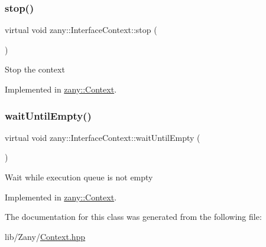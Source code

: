 \mbox{\label{classzany_1_1_interface_context_a13d40a4b37fca39813fe231e4081c022}} 
\subsubsection{\texorpdfstring{stop()}{stop()}}
{\footnotesize\ttfamily virtual void zany\+::\+Interface\+Context\+::stop (\begin{DoxyParamCaption}{ }\end{DoxyParamCaption})\hspace{0.3cm}{\ttfamily [pure virtual]}}

Stop the context 

Implemented in \hyperlink{classzany_1_1_context_ae99b0f88172d429cc43b83effced053e}{zany\+::\+Context}.

\mbox{\label{classzany_1_1_interface_context_a92f9597c6b6b7af0287a7f5178c2d063}} 
\subsubsection{\texorpdfstring{wait\+Until\+Empty()}{waitUntilEmpty()}}
{\footnotesize\ttfamily virtual void zany\+::\+Interface\+Context\+::wait\+Until\+Empty (\begin{DoxyParamCaption}{ }\end{DoxyParamCaption})\hspace{0.3cm}{\ttfamily [pure virtual]}}

Wait while execution queue is not empty 

Implemented in \hyperlink{classzany_1_1_context_aa611ac3befc23b58e8cef92932f21b67}{zany\+::\+Context}.



The documentation for this class was generated from the following file\+:\begin{DoxyCompactItemize}
\item 
lib/\+Zany/\hyperlink{_context_8hpp}{Context.\+hpp}\end{DoxyCompactItemize}
